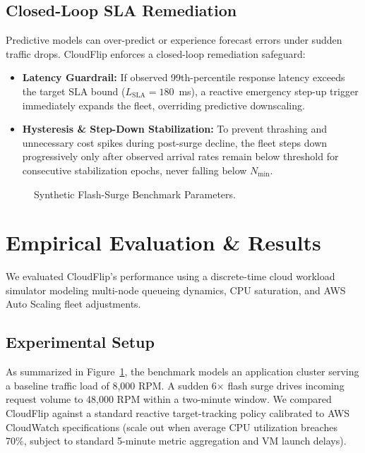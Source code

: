 \documentclass[sigconf,nonacm]{acmart}
\begin{document}
\subsection{Closed-Loop SLA Remediation}
Predictive models can over-predict or experience forecast errors under sudden traffic drops. CloudFlip enforces a closed-loop remediation safeguard:
\begin{itemize}
    \item \textbf{Latency Guardrail:} If observed 99th-percentile response latency exceeds the target SLA bound ($L_{\text{SLA}} = 180$~ms), a reactive emergency step-up trigger immediately expands the fleet, overriding predictive downscaling.
    \item \textbf{Hysteresis & Step-Down Stabilization:} To prevent thrashing and unnecessary cost spikes during post-surge decline, the fleet steps down progressively only after observed arrival rates remain below threshold for consecutive stabilization epochs, never falling below $N_{\min}$.
\end{itemize}

\begin{figure}[t]
\centering
{}
\caption{Synthetic Flash-Surge Benchmark Parameters.}
\label{fig:params}
\end{figure}

\section{Empirical Evaluation & Results}
We evaluated CloudFlip's performance using a discrete-time cloud workload simulator modeling multi-node queueing dynamics, CPU saturation, and AWS Auto Scaling fleet adjustments.

\subsection{Experimental Setup}
As summarized in Figure~\ref{fig:params}, the benchmark models an application cluster serving a baseline traffic load of 8,000 RPM. A sudden 6$\times$ flash surge drives incoming request volume to 48,000 RPM within a two-minute window. We compared CloudFlip against a standard reactive target-tracking policy calibrated to AWS CloudWatch specifications (scale out when average CPU utilization breaches 70\%, subject to standard 5-minute metric aggregation and VM launch delays).
\end{document}
